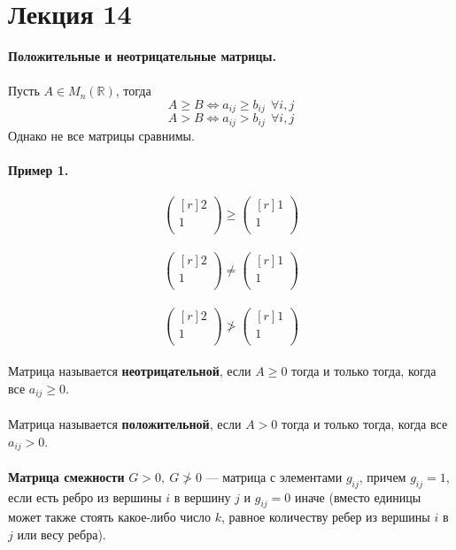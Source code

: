\documentclass[12pt]{article}
\theoremstyle{definition}
\numberwithin{equation}{section}
\begin{document}
	\section *{Лекция 14}
	\noindent\textbf{Положительные и неотрицательные матрицы.}\\ \\
	Пусть $A\in M_n(\mathbb{R})$, тогда
	$$A\geqslant B \Leftrightarrow a_{ij}\geqslant b_{ij} ~~\forall i, j$$
	$$A> B \Leftrightarrow a_{ij}> b_{ij} ~~\forall i, j$$
	Однако не все матрицы сравнимы.\\
	\\
	\textbf{Пример 1.}\\ \\
	\[\begin{pmatrix}[r]
	2\\
	1\\
	\end{pmatrix}\geqslant \begin{pmatrix}[r]
	1\\
	1\\
	\end{pmatrix}\]\\
	\[\begin{pmatrix}[r]
	2\\
	1\\
	\end{pmatrix}\neq \begin{pmatrix}[r]
	1\\
	1\\
	\end{pmatrix}\]\\
	\[\begin{pmatrix}[r]
	2\\
	1\\
	\end{pmatrix}\ngtr \begin{pmatrix}[r]
	1\\
	1\\
	\end{pmatrix}\]
	\\Матрица называется \textbf{неотрицательной}, если $A\geqslant 0$ тогда и только тогда, когда все $a_{ij}\geqslant 0$.\\
	\\
	Матрица называется \textbf{положительной}, если $A> 0$ тогда и только тогда, когда все $a_{ij}> 0$.\\
	\\
	\textbf{Матрица смежности} $G>0,~G\ngtr 0$ --- матрица с элементами $g_{ij}$, причем $g_{ij}=1$, если есть ребро из вершины $i$ в вершину $j$ и $g_{ij}=0$ иначе (вместо единицы может также стоять какое-либо число $k$, равное количеству ребер из вершины $i$ в $j$ или весу ребра).
\end{document}
